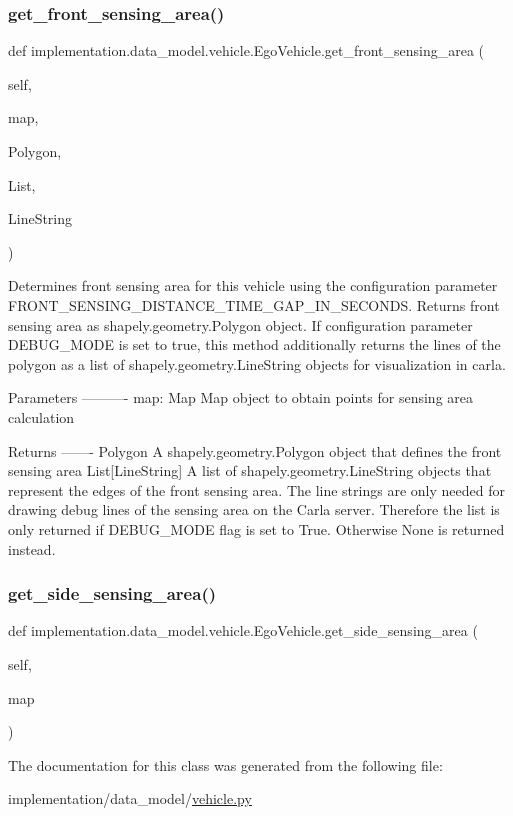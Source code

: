 \subsubsection{\texorpdfstring{get\+\_\+front\+\_\+sensing\+\_\+area()}{get\_front\_sensing\_area()}}
{\footnotesize\ttfamily def implementation.\+data\+\_\+model.\+vehicle.\+Ego\+Vehicle.\+get\+\_\+front\+\_\+sensing\+\_\+area (\begin{DoxyParamCaption}\item[{}]{self,  }\item[{}]{map,  }\item[{}]{Polygon,  }\item[{}]{List,  }\item[{}]{Line\+String }\end{DoxyParamCaption})}

\begin{DoxyVerb}Determines front sensing area for this vehicle using the configuration parameter
FRONT_SENSING_DISTANCE_TIME_GAP_IN_SECONDS. Returns front sensing area as shapely.geometry.Polygon object.
If configuration parameter DEBUG_MODE is set to true, this method additionally returns the lines of the polygon
as a list of shapely.geometry.LineString objects for visualization in carla.

Parameters
----------
map: Map
    Map object to obtain points for sensing area calculation

Returns
-------
Polygon
    A shapely.geometry.Polygon object that defines the front sensing area
List[LineString]
    A list of shapely.geometry.LineString objects that represent the edges of the front sensing area.
    The line strings are only needed for drawing debug lines of the sensing area on the Carla server. Therefore
    the list is only returned if DEBUG_MODE flag is set to True. Otherwise None is returned instead.
\end{DoxyVerb}
 \mbox{\label{classimplementation_1_1data__model_1_1vehicle_1_1_ego_vehicle_ad8165c0170e23589f0c6279ba4f7375d}} 
\subsubsection{\texorpdfstring{get\+\_\+side\+\_\+sensing\+\_\+area()}{get\_side\_sensing\_area()}}
{\footnotesize\ttfamily def implementation.\+data\+\_\+model.\+vehicle.\+Ego\+Vehicle.\+get\+\_\+side\+\_\+sensing\+\_\+area (\begin{DoxyParamCaption}\item[{}]{self,  }\item[{}]{map }\end{DoxyParamCaption})}



The documentation for this class was generated from the following file\+:\begin{DoxyCompactItemize}
\item 
implementation/data\+\_\+model/\hyperlink{vehicle_8py}{vehicle.\+py}\end{DoxyCompactItemize}
